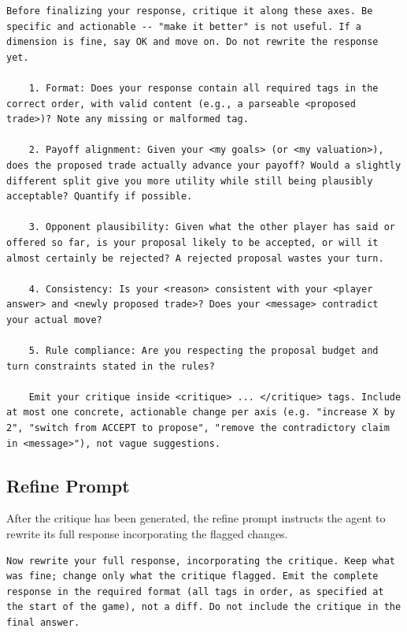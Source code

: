 \begin{lstlisting}[caption={Self-Refine feedback prompt.},label={lst:sr-feedback}]
    Before finalizing your response, critique it along these axes. Be specific and actionable -- "make it better" is not useful. If a dimension is fine, say OK and move on. Do not rewrite the response yet.

    1. Format: Does your response contain all required tags in the correct order, with valid content (e.g., a parseable <proposed trade>)? Note any missing or malformed tag.

    2. Payoff alignment: Given your <my goals> (or <my valuation>), does the proposed trade actually advance your payoff? Would a slightly different split give you more utility while still being plausibly acceptable? Quantify if possible.

    3. Opponent plausibility: Given what the other player has said or offered so far, is your proposal likely to be accepted, or will it almost certainly be rejected? A rejected proposal wastes your turn.
   
    4. Consistency: Is your <reason> consistent with your <player answer> and <newly proposed trade>? Does your <message> contradict your actual move?
   
    5. Rule compliance: Are you respecting the proposal budget and turn constraints stated in the rules?

    Emit your critique inside <critique> ... </critique> tags. Include at most one concrete, actionable change per axis (e.g. "increase X by 2", "switch from ACCEPT to propose", "remove the contradictory claim in <message>"), not vague suggestions.
\end{lstlisting}

\subsection{Refine Prompt}

After the critique has been generated, the refine prompt instructs the agent to rewrite its full response incorporating the flagged changes.

\begin{lstlisting}[caption={Self-Refine refine prompt.},label={lst:sr-refine}]
    Now rewrite your full response, incorporating the critique. Keep what was fine; change only what the critique flagged. Emit the complete response in the required format (all tags in order, as specified at the start of the game), not a diff. Do not include the critique in the final answer.
\end{lstlisting}


